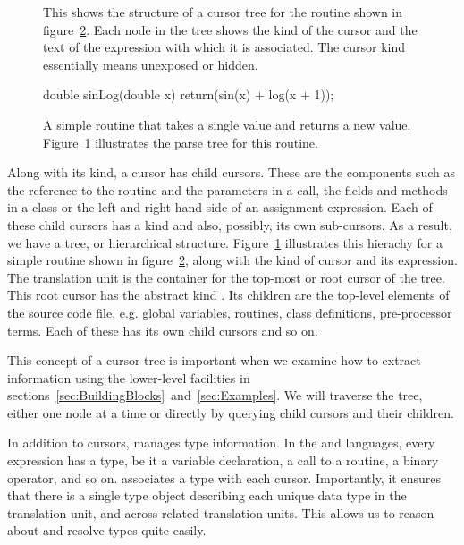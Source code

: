 \begin{figure}
  
\cprotect\caption{This shows the structure of a cursor tree for the 
\C{} routine  shown in figure~\ref{fig:sinLogRoutine}.
Each node in the tree shows the kind of the cursor
and the text of the expression with which it is associated.
The cursor kind  essentially means unexposed or hidden.
}
\label{fig:sinLogTree}  
\end{figure}

\begin{figure}
\centering
\begin{CCode}
              double
              sinLog(double x)
              {
                 return(sin(x) + log(x + 1));
              }
\end{CCode}  

\caption{A simple routine that takes a single  value
and returns a new value. Figure~\ref{fig:sinLogTree} illustrates the
parse tree for this routine.}\label{fig:sinLogRoutine}
\end{figure}


Along with its kind, a cursor has child cursors.  These are the
components such as the reference to the routine and the parameters in
a call, the fields and methods in a \Cpp{} class or the left and right
hand side of an assignment expression. Each of these child cursors has
a kind and also, possibly, its own sub-cursors. As a result, we have a
tree, or hierarchical structure.  Figure~\ref{fig:sinLogTree}
illustrates this hierachy for a simple routine shown in
figure~\ref{fig:sinLogRoutine}, along with the kind of cursor and 
its expression.  The translation unit is the
container for the top-most or root cursor of the tree.  This root
cursor has the abstract kind .  Its
children are the top-level elements of the source code file,
e.g. global variables, routines, class definitions, pre-processor
terms. Each of these has its own child cursors and so on.

This concept of a cursor tree is important when we examine how to
extract information using the lower-level facilities in
sections~\ref{sec:BuildingBlocks}~and~\ref{sec:Examples}.  We will traverse
the tree, either one node at a time or directly by querying child
cursors and their children.

In addition to cursors, \libclang{} manages type information.  In the
\C{} and \Cpp{} languages, every expression has a type, be it a
variable declaration, a call to a routine, a binary operator, and so on.  \libclang{}
associates a type with each cursor.  Importantly, it ensures that
there is a single type object describing each unique data type in the
translation unit, and across related translation units.  This allows
us to reason about and resolve types quite easily.

